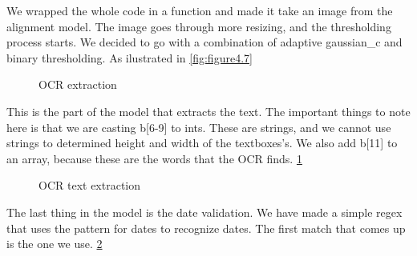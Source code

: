 We wrapped the whole code in a function and made it take an image from the alignment model.
The image goes through more resizing, and the thresholding process starts.
We decided to go with a combination of adaptive gaussian\_c and binary thresholding.
As ilustrated in \ref{fig:figure4.7}


\begin{figure}[h]
    \caption{OCR extraction}
    \label{fig:figure4.8}
\end{figure}

This is the part of the model that extracts the text.
The important things to note here is that we are casting b[6-9] to ints.
These are strings, and we cannot use strings to determined height and width of the textboxes's.
We also add b[11] to an array, because these are the words that the OCR finds.
\ref{fig:figure4.8}

\begin{figure}[h]
    \caption{OCR text extraction}
    \label{fig:figure4.9}
\end{figure}

The last thing in the model is the date validation.
We have made a simple regex that uses the pattern for dates to recognize dates.
The first match that comes up is the one we use.
\ref{fig:figure4.9}